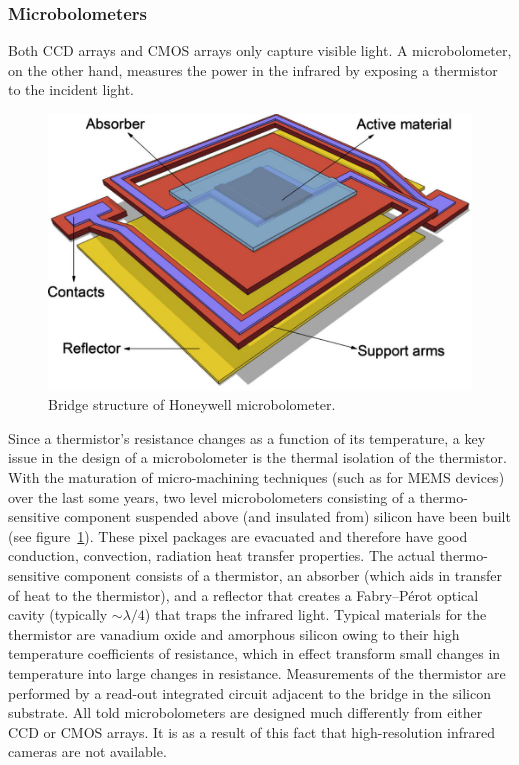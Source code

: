 \subsubsection{Microbolometers}
Both CCD arrays and CMOS arrays only capture visible light.
%
A microbolometer, on the other hand, measures the power in the infrared by exposing a thermistor to the incident light.
%
\begin{figure}[b]
	\center
	\includegraphics[width=.7\linewidth,keepaspectratio]{figures/background/microbolometer2.png}
	\caption{Bridge structure of Honeywell microbolometer\cite{KESIM2014245}.}
	\label{fig:microbolometer}
\end{figure}
%
Since a thermistor's resistance changes as a function of its temperature, a key issue in the design of a microbolometer is the thermal isolation of the thermistor.
%
With the maturation of micro-machining techniques (such as for MEMS devices) over the last some years, two level microbolometers consisting of a thermo-sensitive component suspended above (and insulated from) silicon have been built (see figure~\ref{fig:microbolometer}).
%
These pixel packages are evacuated and therefore have good conduction, convection, radiation heat transfer properties.
%
The actual thermo-sensitive component consists of a thermistor, an absorber (which aids in transfer of heat to the thermistor), and a reflector that creates a Fabry–Pérot optical cavity (typically \({\sim}\lambda/4\)\cite{bolometer}) that traps the infrared light.
%
Typical materials for the thermistor are vanadium oxide and amorphous silicon owing to their high temperature coefficients of resistance\cite{bolometer}, which in effect transform small changes in temperature into large changes in resistance.
%
Measurements of the thermistor are performed by a read-out integrated circuit adjacent to the bridge in the silicon substrate.
%
All told microbolometers are designed much differently from either CCD or CMOS arrays.
%
It is as a result of this fact that high-resolution infrared cameras are not available.

